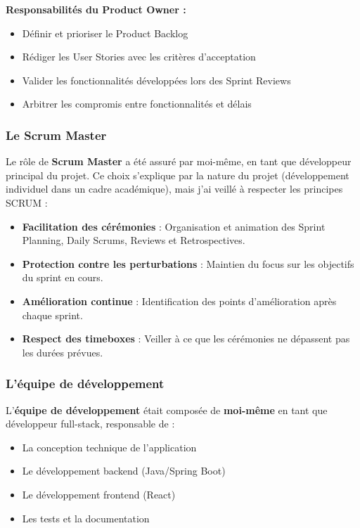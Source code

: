 \documentclass[12pt,a4paper]{report}
\begin{document}
\textbf{Responsabilités du Product Owner :}
\begin{itemize}[leftmargin=1.5cm]
    \item Définir et prioriser le Product Backlog
    \item Rédiger les User Stories avec les critères d'acceptation
    \item Valider les fonctionnalités développées lors des Sprint Reviews
    \item Arbitrer les compromis entre fonctionnalités et délais
\end{itemize}

\subsubsection{Le Scrum Master}

Le rôle de \textbf{Scrum Master} a été assuré par moi-même, en tant que développeur principal du projet. Ce choix s'explique par la nature du projet (développement individuel dans un cadre académique), mais j'ai veillé à respecter les principes SCRUM :

\begin{itemize}[leftmargin=1cm]
    \item \textbf{Facilitation des cérémonies} : Organisation et animation des Sprint Planning, Daily Scrums, Reviews et Retrospectives.
    
    \item \textbf{Protection contre les perturbations} : Maintien du focus sur les objectifs du sprint en cours.
    
    \item \textbf{Amélioration continue} : Identification des points d'amélioration après chaque sprint.
    
    \item \textbf{Respect des timeboxes} : Veiller à ce que les cérémonies ne dépassent pas les durées prévues.
\end{itemize}

\subsubsection{L'équipe de développement}

L'\textbf{équipe de développement} était composée de \textbf{moi-même} en tant que développeur full-stack, responsable de :

\begin{itemize}[leftmargin=1cm]
    \item La conception technique de l'application
    \item Le développement backend (Java/Spring Boot)
    \item Le développement frontend (React)
    \item Les tests et la documentation
\end{itemize}
\end{document}
